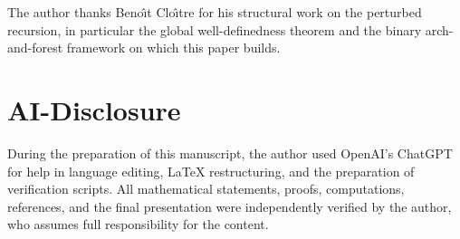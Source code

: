 \documentclass[11pt]{article}
\theoremstyle{definition}
\theoremstyle{remark}
\begin{document}
The author thanks Beno\^{\i}t Clo\^{\i}tre for his structural work on the
perturbed recursion, in particular the global well-definedness theorem and
the binary arch-and-forest framework on which this paper builds.

\section*{AI-Disclosure}

During the preparation of this manuscript, the author used OpenAI's
ChatGPT for help in language editing, LaTeX restructuring, and the
preparation of verification scripts.  All mathematical statements, proofs,
computations, references, and the final presentation were independently
verified by the author, who assumes full responsibility for the content.
\end{document}
